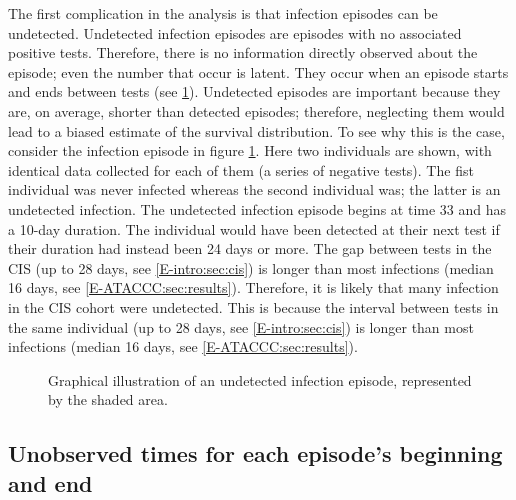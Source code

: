 \documentclass[thesis.tex]{subfiles}
\begin{document}
The first complication in the analysis is that infection episodes can be undetected.
Undetected infection episodes are episodes with no associated positive tests.
Therefore, there is no information directly observed about the episode; even the number that occur is latent.
They occur when an episode starts and ends between tests (see \cref{perf-test:fig:truncation}).
Undetected episodes are important because they are, on average, shorter than detected episodes; therefore, neglecting them would lead to a biased estimate of the survival distribution.
To see why this is the case, consider the infection episode in figure \cref{perf-test:fig:truncation}.
Here two individuals are shown, with identical data collected for each of them (a series of negative
tests).
The fist individual was never infected whereas the second individual was; the latter is an undetected infection. 
The undetected infection episode begins at time 33 and has a 10-day duration.
The individual would have been detected at their next test if their duration had instead been 24 days or more.
The gap between tests in the CIS (up to 28 days, see \cref{E-intro:sec:cis}) is longer than most infections (median 16 days, see \cref{E-ATACCC:sec:results}).
Therefore, it is likely that many infection in the CIS cohort were undetected.
This is because the interval between tests in the same individual (up to 28 days, see \cref{E-intro:sec:cis}) is longer than most infections (median 16 days, see \cref{E-ATACCC:sec:results}).
\begin{figure}
  \caption[Undetected episodes in CIS data]{Graphical illustration of an undetected infection episode, represented by the shaded area. \label{perf-test:fig:truncation}}
\end{figure}

\subsection{Unobserved times for each episode's beginning and end} \label{perf-test:sec:interval-censoring}
\end{document}
